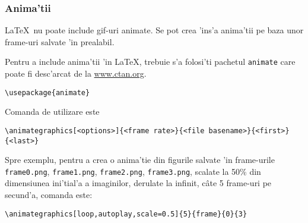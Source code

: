 \subsubsection{Anima'tii}

\LaTeX \, nu poate include gif-uri animate. Se pot crea 'ins'a anima'tii pe baza unor frame-uri salvate 'in prealabil. 


Pentru a include anima'tii 'in \LaTeX, trebuie s'a folosi'ti pachetul {\tt{animate}} care poate fi desc'arcat de la \href{https://www.ctan.org/tex-archive/macros/latex/contrib/animate?lang=en}{www.ctan.org}. 
\begin{verbatim}
\usepackage{animate}
\end{verbatim}
Comanda de utilizare este
\begin{verbatim}
\animategraphics[<options>]{<frame rate>}{<file basename>}{<first>}{<last>}
\end{verbatim}
Spre exemplu, pentru a crea o anima'tie din figurile salvate 'in frame-urile {\tt{frame0.png}}, {\tt{frame1.png}}, {\tt{frame2.png}}, {\tt{frame3.png}}, scalate la 50\% din dimensiunea ini'tial'a a imaginilor, derulate la infinit, c\^ate 5 frame-uri pe secund'a, comanda este:
\begin{verbatim}
\animategraphics[loop,autoplay,scale=0.5]{5}{frame}{0}{3}
\end{verbatim}





